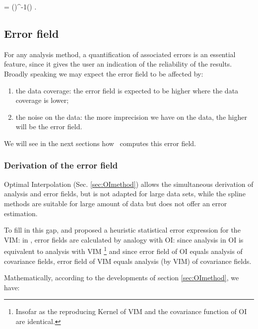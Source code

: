\be
\boldsymbol{\varphi} = ()^{-1}() .
\label{eq:solution2}
\ee


\subsection{Error field}

For any analysis method, a quantification of associated errors is an essential feature, since it gives the user an indication of the reliability of the results. Broadly speaking we may expect the error field to be affected by:
\begin{enumerate}
\item the data coverage: the error field is expected to be higher where the data coverage is lower;
\item the noise on the data: the more imprecision we have on the data, the higher will be the error field.
\end{enumerate}

We will see in the next sections how \diva\, computes this error field.

\subsubsection{Derivation of the error field}

Optimal Interpolation (Sec. \ref{sec:OImethod}) allows the simultaneous derivation of analysis and error fields, but is not adapted for large data sets, while the spline methods are suitable for large amount of data but does not offer an error estimation.

To fill in this gap, \cite{BRANKART98} and \cite{RIXEN00} proposed a heuristic statistical error expression for the VIM: in \diva, error fields are calculated by analogy with OI: since analysis in OI is equivalent to analysis with VIM \footnote{Insofar as the reproducing Kernel of VIM and the covariance function of OI are identical.} and 
since error field of OI equals analysis of covariance fields, error field of VIM equals analysis (by VIM) of covariance fields.

Mathematically, according to the developments of section \ref{sec:OImethod}, we have:


